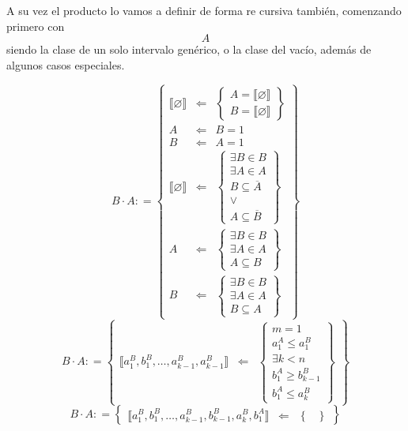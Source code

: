 \begin{enumerate}
  A su vez el producto lo vamos a definir de forma re cursiva también,
  comenzando primero con \[A\] siendo la clase de un solo intervalo
  genérico, o la clase del vacío, además de algu\-nos casos especiales.

  \[{B \cdot A}{: =}\begin{Bmatrix}
  {⟦\varnothing ⟧} & {\Leftarrow} & \begin{Bmatrix}
  {A = {⟦\varnothing ⟧}} \\
  {B = {⟦\varnothing ⟧}}
  \end{Bmatrix} \\
  A & {\Leftarrow} & {B = 1} \\
  B & {\Leftarrow} & {A = 1} \\
  {⟦\varnothing ⟧} & {\Leftarrow} & \begin{Bmatrix}
  {\exists{B \in B}} \\
  {\exists{A \in A}} \\
  {B \subseteq \overline{A}} \\
   \vee \\
  {A \subseteq \overline{B}}
  \end{Bmatrix} \\
  A & {\Leftarrow} & \begin{Bmatrix}
  {\exists{B \in B}} \\
  {\exists{A \in A}} \\
  {A \subseteq B}
  \end{Bmatrix} \\
  B & {\Leftarrow} & \begin{Bmatrix}
  {\exists{B \in B}} \\
  {\exists{A \in A}} \\
  {B \subseteq A}
  \end{Bmatrix}
  \end{Bmatrix}\]\[{{B \cdot A}{: =}}\begin{Bmatrix}
  {⟦{{a_{1}^{B},b_{1}^{B}},\ldots,{a_{k - 1}^{B},a_{k - 1}^{B}}}⟧} & {\Leftarrow} & \begin{Bmatrix}
  {m = 1} \\
  {a_{1}^{A} \leq a_{1}^{B}} \\
  {\exists{k < n}} \\
  {b_{1}^{A} \geq b_{k - 1}^{B}} \\
  {b_{1}^{A} \leq a_{k}^{B}}
  \end{Bmatrix}
  \end{Bmatrix}\]\[{{B \cdot A}{: =}}\begin{Bmatrix}
  {⟦{{a_{1}^{B},b_{1}^{B}},\ldots,{a_{k - 1}^{B},b_{k - 1}^{B}},{a_{k}^{B},b_{1}^{A}}}⟧} & {\Leftarrow} & \begin{Bmatrix}

\end{Bmatrix}
\end{Bmatrix}\]
\end{enumerate}
